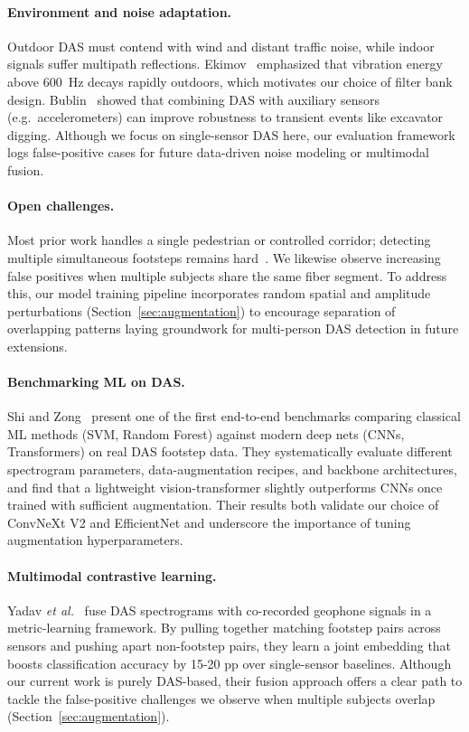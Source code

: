 \paragraph{Environment and noise adaptation.}
Outdoor DAS must contend with wind and distant traffic noise, while indoor signals suffer multipath reflections. Ekimov~\cite{ekimov2007ultrasonic} emphasized that vibration energy above 600~Hz decays rapidly outdoors, which motivates our choice of filter bank design. Bublin~\cite{bublin2021event} showed that combining DAS with auxiliary sensors (e.g.\ accelerometers) can improve robustness to transient events like excavator digging. Although we focus on single-sensor DAS here, our evaluation framework logs false-positive cases for future data-driven noise modeling or multimodal fusion.

\paragraph{Open challenges.}
Most prior work handles a single pedestrian or controlled corridor; detecting multiple simultaneous footsteps remains hard~\cite{footstep}. We likewise observe increasing false positives when multiple subjects share the same fiber segment. To address this, our model training pipeline incorporates random spatial and amplitude perturbations (Section~\ref{sec:augmentation}) to encourage separation of overlapping patterns laying groundwork for multi-person DAS detection in future extensions.

\paragraph{Benchmarking ML on DAS.}
Shi and Zong~\cite{Shi2025Benchmark} present one of the first end-to-end benchmarks comparing classical ML methods (SVM, Random Forest) against modern deep nets (CNNs, Transformers) on real DAS footstep data. They systematically evaluate different spectrogram parameters, data-augmentation recipes, and backbone architectures, and find that a lightweight vision-transformer slightly outperforms CNNs once trained with sufficient augmentation. Their results both validate our choice of ConvNeXt V2 and EfficientNet and underscore the importance of tuning augmentation hyperparameters.

\paragraph{Multimodal contrastive learning.}
Yadav \textit{et al.}~\cite{Yadav2021Contrastive} fuse DAS spectrograms with co-recorded geophone signals in a metric-learning framework. By pulling together matching footstep pairs across sensors and pushing apart non-footstep pairs, they learn a joint embedding that boosts classification accuracy by 15-20 pp over single-sensor baselines. Although our current work is purely DAS-based, their fusion approach offers a clear path to tackle the false-positive challenges we observe when multiple subjects overlap (Section~\ref{sec:augmentation}).

